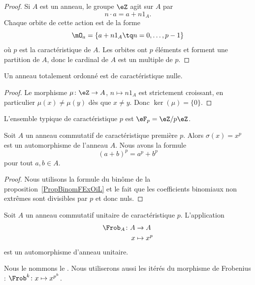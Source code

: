 \begin{proof}
    Si \( A\) est un anneau, le groupe \( \eZ\) agit sur \( A\) par
    \begin{equation}
        n\cdot a=a+n1_A.
    \end{equation}
    Chaque orbite de cette action est de la forme
    \begin{equation}
        \mO_a=\{ a+n1_A\tq n=0,\ldots, p-1 \}
    \end{equation}
    où \( p\) est la caractéristique de \( A\). Les orbites ont \( p\) éléments et forment une partition de \( A\), donc le cardinal de \( A\) est un multiple de \( p\).
\end{proof}

\begin{lemma}        \label{LEMooJQIKooQgukqn}
    Un anneau totalement ordonné est de caractéristique nulle.
\end{lemma}

\begin{proof}
    Le morphisme \( \mu\colon \eZ\to A\), \( n\mapsto n 1_A\) est strictement croissant, en particulier \( \mu(x)\neq \mu(y)\) dès que \( x\neq y\). Donc \( \ker(\mu)=\{ 0 \}\).
\end{proof}

L'ensemble typique de caractéristique \( p\) est \( \eF_p=\eZ/p\eZ\).



\begin{proposition}     \label{Propqrrdem}
    Soit \( A\) un anneau commutatif de caractéristique première \( p\). Alors \( \sigma(x)=x^p\) est un automorphisme de l'anneau \( A\). Nous avons la formule
    \begin{equation}
        (a+b)^p=a^p+b^p
    \end{equation}
    pour tout \( a,b\in A\).
\end{proposition}

\begin{proof}
    Nous utilisons la formule du binôme de la proposition~\ref{PropBinomFExOiL} et le fait que les coefficients binomiaux non extrêmes sont divisibles par \( p\) et donc nuls.
\end{proof}

\begin{proposition} \label{PropFrobHAMkTY}
    Soit \( A\) un anneau commutatif unitaire de caractéristique \( p\). L'application
    \begin{equation}
        \begin{aligned}
            \Frob_A\colon A&\to A \\
            x&\mapsto x^p
        \end{aligned}
    \end{equation}
    est un automorphisme d'anneau unitaire.
\end{proposition}
Nous le nommons le . Nous utiliserons aussi les itérés du morphisme de Frobenius : \( \Frob^k\colon x\mapsto x^{p^k}\).

